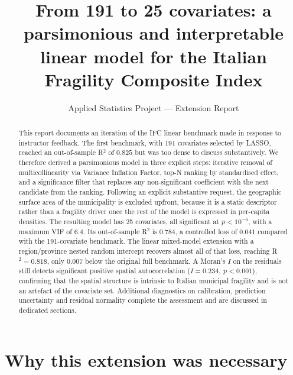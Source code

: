 \documentclass[11pt,a4paper]{article}
\title{From 191 to 25 covariates: a parsimonious and interpretable\\
  linear model for the Italian Fragility Composite Index}
\author{Applied Statistics Project --- Extension Report}
\date{}
\begin{document}
\maketitle

\begin{abstract}
\noindent
This report documents an iteration of the IFC linear benchmark made
in response to instructor feedback. The first benchmark, with 191
covariates selected by LASSO, reached an out-of-sample R$^{2}$ of
$0.825$ but was too dense to discuss substantively. We therefore
derived a parsimonious model in three explicit steps: iterative
removal of multicollinearity via Variance Inflation Factor, top-N
ranking by standardised effect, and a significance filter that
replaces any non-significant coefficient with the next candidate
from the ranking. Following an explicit substantive request, the
geographic surface area of the municipality is excluded upfront,
because it is a static descriptor rather than a fragility driver
once the rest of the model is expressed in per-capita densities.
The resulting model has 25 covariates, all significant at
$p < 10^{-6}$, with a maximum VIF of $6.4$. Its out-of-sample R$^{2}$
is $0.784$, a controlled loss of $0.041$ compared with the
191-covariate benchmark. The linear mixed-model extension with a
region/province nested random intercept recovers almost all of that
loss, reaching R$^{2} = 0.818$, only $0.007$ below the original full
benchmark. A Moran's $I$ on the residuals still detects significant
positive spatial autocorrelation
($I = 0.234,\ p < 0.001$), confirming that the spatial structure is
intrinsic to Italian municipal fragility and is not an artefact of
the covariate set. Additional diagnostics on calibration, prediction
uncertainty and residual normality complete the assessment and are
discussed in dedicated sections.
\end{abstract}

\section*{Why this extension was necessary}
\end{document}
